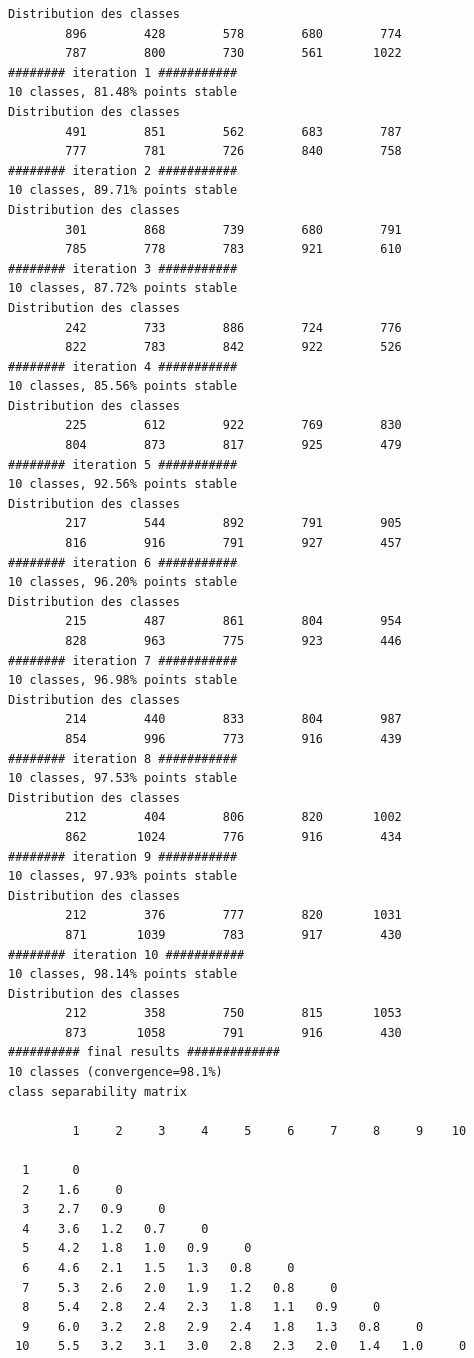 \documentclass[land,article,submit,pdftex,moreauthors]{Definitions/mdpi}
\begin{document}
\begin{scriptsize}
\begin{verbatim}
Distribution des classes
        896        428        578        680        774
        787        800        730        561       1022
######## iteration 1 ###########
10 classes, 81.48% points stable
Distribution des classes
        491        851        562        683        787
        777        781        726        840        758
######## iteration 2 ###########
10 classes, 89.71% points stable
Distribution des classes
        301        868        739        680        791
        785        778        783        921        610
######## iteration 3 ###########
10 classes, 87.72% points stable
Distribution des classes
        242        733        886        724        776
        822        783        842        922        526
######## iteration 4 ###########
10 classes, 85.56% points stable
Distribution des classes
        225        612        922        769        830
        804        873        817        925        479
######## iteration 5 ###########
10 classes, 92.56% points stable
Distribution des classes
        217        544        892        791        905
        816        916        791        927        457
######## iteration 6 ###########
10 classes, 96.20% points stable
Distribution des classes
        215        487        861        804        954
        828        963        775        923        446
######## iteration 7 ###########
10 classes, 96.98% points stable
Distribution des classes
        214        440        833        804        987
        854        996        773        916        439
######## iteration 8 ###########
10 classes, 97.53% points stable
Distribution des classes
        212        404        806        820       1002
        862       1024        776        916        434
######## iteration 9 ###########
10 classes, 97.93% points stable
Distribution des classes
        212        376        777        820       1031
        871       1039        783        917        430
######## iteration 10 ###########
10 classes, 98.14% points stable
Distribution des classes
        212        358        750        815       1053
        873       1058        791        916        430
########## final results #############
10 classes (convergence=98.1%)
class separability matrix

         1     2     3     4     5     6     7     8     9    10

  1      0
  2    1.6     0
  3    2.7   0.9     0
  4    3.6   1.2   0.7     0
  5    4.2   1.8   1.0   0.9     0
  6    4.6   2.1   1.5   1.3   0.8     0
  7    5.3   2.6   2.0   1.9   1.2   0.8     0
  8    5.4   2.8   2.4   2.3   1.8   1.1   0.9     0
  9    6.0   3.2   2.8   2.9   2.4   1.8   1.3   0.8     0
 10    5.5   3.2   3.1   3.0   2.8   2.3   2.0   1.4   1.0     0


\end{verbatim}
\end{scriptsize}
\end{document}
